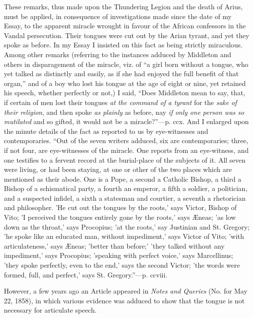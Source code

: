 These remarks, thus made upon the Thundering Legion and the death of
Arius, must be applied, in consequence of investigations made since the
date of my Essay, to the apparent miracle wrought in favour of the
African confessors in the Vandal persecution. Their tongues were
cut out by the Arian tyrant, and yet they spoke as before. In my Essay I
insisted on this fact as being strictly miraculous. Among other remarks
(referring to the instances adduced by Middleton and others in
disparagement of the miracle, viz. of ``a girl born without a
tongue, who yet talked as distinctly and easily, as if she had enjoyed
the full benefit of that organ,'' and of a boy who lost his tongue
at the age of eight or nine, yet retained his speech, whether perfectly
or not,) I said, ``Does Middleton mean to say, that, if certain of
men lost their tongues \emph{at the command of a tyrant} for the \emph{sake
of their religion}, and then spoke \emph{as plainly} as before, nay \emph{if
only one person was so mutilated} and so gifted, it would not be a
miracle?''—p. ccx. And I enlarged upon the minute details of the
fact as reported to us by eye-witnesses and contemporaries. ``Out of
the seven writers adduced, six are contemporaries; three, if not four,
are eye-witnesses of the miracle. One reports from an eye-witness, and
one testifies to a fervent record at the burial-place of the subjects of
it. All seven were living, or had been staying, at one or other of the
two places which are mentioned as their abode. One is a Pope, a second a
Catholic Bishop, a third a Bishop of a schismatical party, a fourth an
emperor, a fifth a soldier, a politician, and a suspected infidel, a
sixth a statesman and courtier, a seventh a rhetorician and philosopher.
'He cut out the tongues by the roots,' says Victor, Bishop of Vito; 'I
perceived the tongues entirely gone by the roots,' says Æneas; 'as low
down as the throat,' says Procopius; 'at the roots,' say Justinian and
St. Gregory; 'he spoke like an educated man, without impediment,' says
Victor of Vito; 'with articulateness,' says Æneas; 'better than
before;' 'they talked without any impediment,' says Procopius; 'speaking
with perfect voice,' says Marcellinus; 'they spoke perfectly, even to
the end,' says the second Victor; 'the words were formed, full, and
perfect,' says St. Gregory.''—p. ccviii.

However, a few years ago an Article appeared in \emph{Notes and
Queries} (No. for May 22, 1858), in which various evidence was
adduced to show that the tongue is not necessary for articulate speech.

